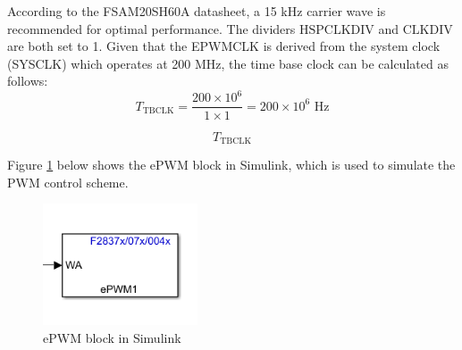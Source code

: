 According to the FSAM20SH60A datasheet, a 15 kHz carrier wave is recommended for optimal performance. The dividers \( \text{HSPCLKDIV} \) and \( \text{CLKDIV} \) are both set to 1. Given that the EPWMCLK is derived from the system clock (SYSCLK) which operates at 200 MHz, the time base clock can be calculated as follows:
\[
T_{\text{TBCLK}} = \frac{200 \times 10^6}{1 \times 1} = 200 \times 10^6 \text{ Hz}
\]

\[
T_{\text{TBCLK}}

\]

Figure \ref{fig:svpwm_block} below shows the ePWM block in Simulink, which is used to simulate the PWM control scheme.

\begin{figure}[ht]
    \centering
    \includegraphics[width=1.8in]{sections/section6/images/SVPWM/ePWMBlock.png}
    \caption{ePWM block in Simulink}
    \label{fig:svpwm_block}
\end{figure}

\newpage